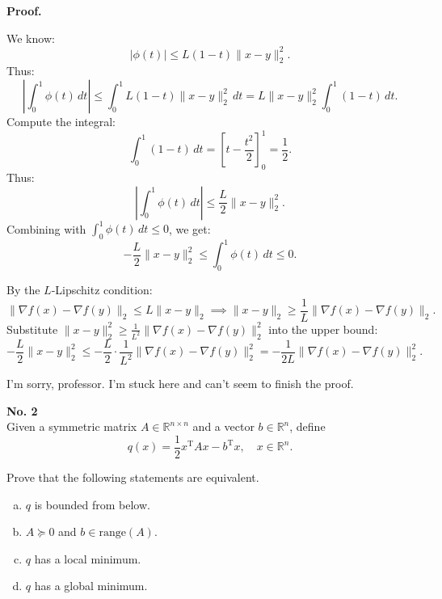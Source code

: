 \documentclass[a4paper, 11pt]{article}
\newenvironment{problem}[2][No.]
    { \begin{mdframed}[backgroundcolor=gray!5] \textbf{#1 #2} \\}
    {  \end{mdframed}}
\newenvironment{solution}
    {\textbf{Proof.}}
    {}
\begin{document}
\begin{solution}
\begin{enumerate}
We know:
$$
|\phi(t)| \leq L (1 - t) \|x - y\|_2^2.
$$
Thus:
$$
\left| \int_0^1 \phi(t) \, dt \right| \leq \int_0^1 L (1 - t) \|x - y\|_2^2 \, dt = L \|x - y\|_2^2 \int_0^1 (1 - t) \, dt.
$$
Compute the integral:
$$
\int_0^1 (1 - t) \, dt = \left[ t - \frac{t^2}{2} \right]_0^1 = \frac{1}{2}.
$$
Thus:
$$
\left| \int_0^1 \phi(t) \, dt \right| \leq \frac{L}{2} \|x - y\|_2^2.
$$
Combining with \( \int_0^1 \phi(t) \, dt \leq 0 \), we get:
$$
-\frac{L}{2} \|x - y\|_2^2\leq \int_0^1 \phi(t) \, dt \leq 0 .
$$

By the \( L \)-Lipschitz condition:
$$
\|\nabla f(x) - \nabla f(y)\|_2 \leq L \|x - y\|_2 \implies \|x - y\|_2 \geq \frac{1}{L} \|\nabla f(x) - \nabla f(y)\|_2.
$$
Substitute \( \|x - y\|_2^2 \geq \frac{1}{L^2} \|\nabla f(x) - \nabla f(y)\|_2^2 \) into the upper bound:
$$
-\frac{L}{2} \|x - y\|_2^2 \leq -\frac{L}{2} \cdot \frac{1}{L^2} \|\nabla f(x) - \nabla f(y)\|_2^2 = -\frac{1}{2L} \|\nabla f(x) - \nabla f(y)\|_2^2.
$$

I'm sorry, professor. I'm stuck here and can't seem to finish the proof.
	\end{enumerate}
\end{solution}

\begin{problem}{2}
	Given a symmetric matrix \( A \in \mathbb{R}^{n \times n} \) and a vector \( b \in \mathbb{R}^n \), define
$$
	q(x) = \frac{1}{2} x^{\mathrm{T}} A x - b^{\mathrm{T}} x, \quad x \in \mathbb{R}^n.
$$
	
	Prove that the following statements are equivalent.
	
	\begin{enumerate}[(a)]
		\item \( q \) is bounded from below.
		\item \( A \succeq 0 \) and \( b \in \mathrm{range}(A) \).
		\item \( q \) has a local minimum.
		\item \( q \) has a global minimum.
	\end{enumerate}
\end{problem}
\end{document}
